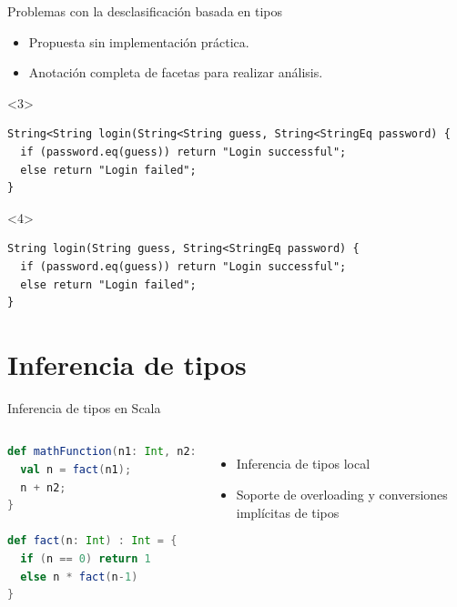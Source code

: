 \documentclass[aspectratio=169,10pt]{beamer}
\begin{document}
\begin{frame}[fragile]{Problemas con la desclasificación basada en tipos}
	\begin{itemize} \pause
		\item Propuesta sin implementación práctica. \pause
		\item Anotación completa de facetas para realizar análisis. \pause
	\end{itemize}
	\vspace{1cm}
	\begin{onlyenv}
\begin{lstlisting}[basicstyle=\fontsize{9}{9}\ttfamily]
String<String login(String<String guess, String<StringEq password) {
  if (password.eq(guess)) return "Login successful";
  else return "Login failed";
}
\end{lstlisting}

	\end{onlyenv}
	\begin{onlyenv}
\begin{lstlisting}[basicstyle=\fontsize{9}{9}\ttfamily]
String login(String guess, String<StringEq password) {
  if (password.eq(guess)) return "Login successful";
  else return "Login failed";
}
\end{lstlisting}

	\end{onlyenv}
\end{frame}

\section{Inferencia de tipos}

\begin{frame}[fragile]{Inferencia de tipos en Scala}
	\begin{columns}[T,onlytextwidth]
\begin{lstlisting}[language=Scala,basicstyle=\fontsize{9}{9}\ttfamily]
def mathFunction(n1: Int, n2: Float) = {
  val n = fact(n1);
  n + n2;
}

def fact(n: Int) : Int = {
  if (n == 0) return 1
  else n * fact(n-1)
}
\end{lstlisting} \pause
		\begin{itemize}
			\item Inferencia de tipos local \pause
			\item Soporte de overloading y conversiones implícitas de tipos
		\end{itemize}
	\end{columns}
\end{frame}
\end{document}
